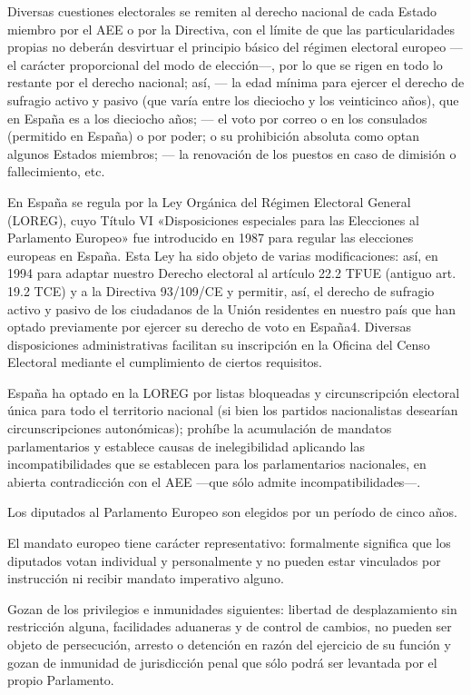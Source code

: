 \documentclass[10pt,a4paper]{article}
\begin{document}
Diversas cuestiones electorales se remiten al derecho nacional de cada Estado miembro por el AEE o por la Directiva, con el límite de que las particularidades propias no deberán desvirtuar el principio básico del régimen electoral europeo —el carácter proporcional del modo de elección—, por lo que se rigen en todo lo restante por el derecho nacional; así,
— la edad mínima para ejercer el derecho de sufragio activo y pasivo (que varía entre los dieciocho y los veinticinco años), que en España es a los dieciocho años;
— el voto por correo o en los consulados (permitido en España) o por poder; o su prohibición absoluta como optan algunos Estados miembros;
— la renovación de los puestos en caso de dimisión o fallecimiento, etc.

En España se regula por la Ley Orgánica del Régimen Electoral General (LOREG), cuyo Título VI «Disposiciones especiales para las Elecciones al Parlamento Europeo» fue introducido en 1987 para regular las elecciones europeas en España. Esta Ley ha sido objeto de varias modificaciones: así, en 1994 para adaptar nuestro Derecho electoral al artículo 22.2 TFUE (antiguo art. 19.2 TCE) y a la Directiva 93/109/CE y permitir, así, el derecho de sufragio activo y pasivo de los ciudadanos de la Unión residentes en nuestro país que han optado previamente por ejercer su derecho de voto en España4. Diversas disposiciones administrativas facilitan su inscripción en la Oficina del Censo Electoral mediante el cumplimiento de ciertos requisitos.

España ha optado en la LOREG por listas bloqueadas y circunscripción electoral única para todo el territorio nacional (si bien los partidos nacionalistas desearían circunscripciones autonómicas); prohíbe la acumulación de mandatos parlamentarios y establece causas de inelegibilidad aplicando las incompatibilidades que se establecen para los parlamentarios nacionales, en abierta contradicción con el AEE —que sólo admite incompatibilidades—.

Los diputados al Parlamento Europeo son elegidos por un período de cinco años.

El mandato europeo tiene carácter representativo: formalmente significa que los diputados votan individual y personalmente y no pueden estar vinculados por instrucción ni recibir mandato imperativo alguno.

Gozan de los privilegios e inmunidades siguientes: libertad de desplazamiento sin restricción alguna, facilidades aduaneras y de control de cambios, no pueden ser objeto de persecución, arresto o detención en razón del ejercicio de su función y gozan de inmunidad de jurisdicción penal que sólo podrá ser levantada por el propio Parlamento.
\end{document}
